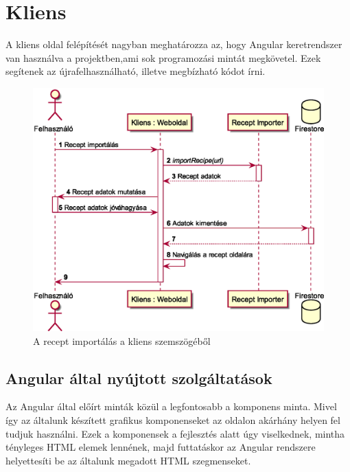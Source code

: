 \documentclass[12pt]{report}
\theoremstyle{definition}
\begin{document}
\section{Kliens}
A kliens oldal felépítését nagyban meghatározza az, hogy Angular keretrendszer van használva a projektben,ami sok programozási mintát megkövetel. Ezek segítenek az újrafelhasználható, illetve megbízható kódot írni.


\noindent
\begin{figure}[H]
	\centering
	\includegraphics[width=.8\textwidth]{out/diagrams/clientRecipeImport/clientRecipeImport.eps}
	\caption{A recept importálás a kliens szemszögéből}
    \label{fig:clientRecipeImport}
\end{figure}

\subsection{Angular által nyújtott szolgáltatások}
Az Angular által előírt minták közül a legfontosabb a komponens minta. Mivel így az általunk készített grafikus komponenseket az oldalon akárhány helyen fel tudjuk használni. Ezek a komponensek a fejlesztés alatt úgy viselkednek, mintha tényleges HTML elemek lennének, majd futtatáskor az Angular rendszere helyettesíti be az általunk megadott HTML szegmenseket.
\end{document}
